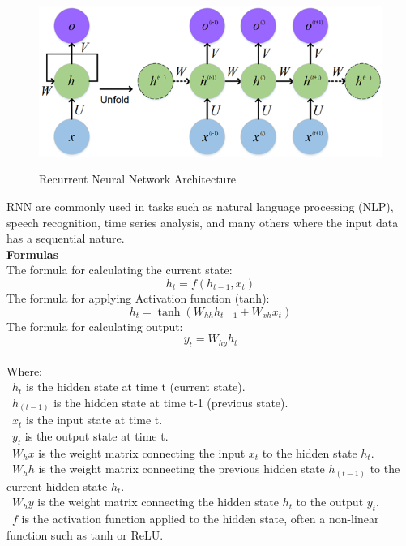 \documentclass{ieeeojies}
\begin{document}
\begin{figure}[H]
    \centering
    \includegraphics[width=\linewidth]{bibliography/RNN.png}
    \caption{Recurrent Neural Network Architecture} \cite{b6}
    \label{fig:enter-label}
\end{figure}
    
RNN are commonly used in tasks such as natural language processing (NLP), speech recognition, time series analysis, and many others where the input data has a sequential nature.\\

\textbf{Formulas}\\
The formula for calculating the current state:
    \[h_t = f(h_{t-1}, x_t)\]
The formula for applying Activation function (tanh):
    \[h_t = \tanh(W_{hh} h_{t-1} + W_{xh} x_t)\]
The formula for calculating output:
    \[y_t = W_{hy} h_t\]
\\
Where:\\
    \indent\ \(h_t\) is the hidden state at time t (current state).\\
    \indent\ \(h_(t-1)\) is the hidden state at time t-1 (previous state).\\
    \indent\ \(x_t\) is the input state at time t.\\
    \indent\ \(y_t\) is the output state at time t.\\
    \indent\ \(W_hx\) is the weight matrix connecting the input \(x_t\) to the hidden state \(h_t\).\\
    \indent\ \(W_hh\) is the weight matrix connecting the previous hidden state \(h_(t-1)\) to the current hidden state \(h_t\).\\
    \indent\ \(W_hy\) is the weight matrix connecting the hidden state \(h_t\) to the output \(y_t\).\\
    \indent\ \(f\) is the activation function applied to the hidden state, often a non-linear function such as tanh or ReLU.
\end{document}
